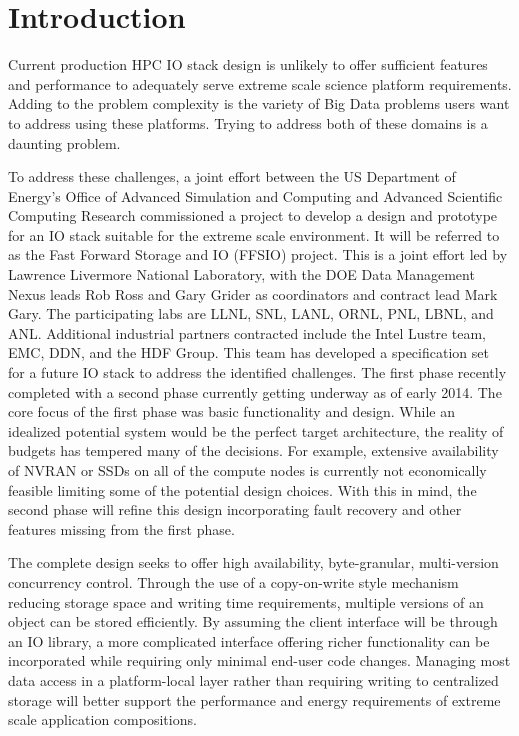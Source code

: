 \documentclass[conference]{IEEEtran}
\begin{document}

\section{Introduction}

Current production HPC IO stack design is unlikely to offer sufficient features
and performance to adequately serve extreme scale science platform
requirements.  Adding to the problem complexity is the variety of Big Data
problems users want to address using these platforms. Trying to address both of
these domains is a daunting problem.

To address these challenges, a joint effort between the US Department of
Energy's Office of Advanced Simulation and Computing and Advanced Scientific
Computing Research commissioned a project to develop a design and prototype for
an IO stack suitable for the extreme scale environment. It will be referred to
as the Fast Forward Storage and IO (FFSIO) project. This is a joint effort led
by Lawrence Livermore National Laboratory, with the DOE Data Management Nexus
leads Rob Ross and Gary Grider as coordinators and contract lead Mark Gary. The
participating labs are LLNL, SNL, LANL, ORNL, PNL, LBNL, and ANL.  Additional
industrial partners contracted include the Intel Lustre team, EMC, DDN, and the
HDF Group. This team has developed a specification
set~\cite{fastforward:2014:docs} for a future IO stack to address the
identified challenges. The first phase recently completed with a second phase
currently getting underway as of early 2014. The core focus of the first phase
was basic functionality and design. While an idealized potential system would
be the perfect target architecture, the reality of budgets has tempered many of
the decisions. For example, extensive availability of NVRAN or SSDs on all of
the compute nodes is currently not economically feasible limiting some of the
potential design choices.  With this in mind, the second phase will refine this
design incorporating fault recovery and other features missing from the first
phase.

The complete design seeks to offer high availability, byte-granular,
multi-version concurrency control. Through the use of a copy-on-write style
mechanism reducing storage space and writing time requirements, multiple
versions of an object can be stored efficiently. By assuming the client
interface will be through an IO library, a more complicated interface offering
richer functionality can be incorporated while requiring only minimal end-user
code changes.  Managing most data access in a platform-local layer rather than
requiring writing to centralized storage will better support the performance
and energy requirements of extreme scale application compositions.
\end{document}
